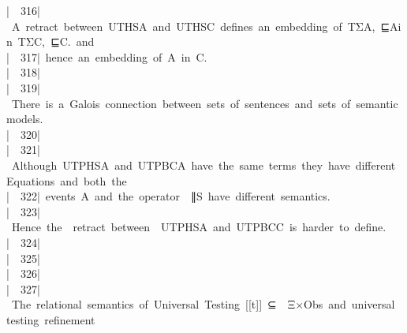 \documentclass{article}
\newcommand{\syntaxCOMMENTA}[1]{\textcolor[rgb]{0.8,0.0,0.0}{#1}}
\newcommand{\syntaxCOMMENTA}[1]{\textcolor[rgb]{0.8,0.0,0.0}{#1}}
\newcommand{\syntaxCOMMENTA}[1]{\textcolor[rgb]{0.8,0.0,0.0}{#1}}
\newcommand{\syntaxCOMMENTA}[1]{\textcolor[rgb]{0.8,0.0,0.0}{\textbf{#1}}}
\newcommand{\syntaxCOMMENTA}[1]{\textcolor[rgb]{0.8,0.0,0.0}{#1}}
\newcommand{\syntaxCOMMENTA}[1]{\textcolor[rgb]{0.8,0.0,0.0}{#1}}
\newcommand{\syntaxCOMMENTA}[1]{\textcolor[rgb]{0.0,0.0,0.0}{#1}}
\newcommand{\gutter}[1]{\textcolor[rgb]{0,0,0}{{|}#1}}
\newcommand{\gutterH}[1]{\textcolor[rgb]{1,0,0}{{|}#1}}
\begin{document}
\gutter{\ \ 316{|}\ }\syntaxCOMMENTA{A{\ }retract{\ }between{\ }UTHS\usebox{\underscorebox}A{\ }and{\ }UTHS\usebox{\underscorebox}C{\ }defines{\ }an{\ }embedding{\ }of{\ }\usebox{\lessthan}T\usebox{\underscorebox}Σ\usebox{\underscorebox}A,{\ }⊑\usebox{\underscorebox}A\usebox{\greaterthan}{\ }in{\ }\usebox{\lessthan}T\usebox{\underscorebox}Σ\usebox{\underscorebox}C,{\ }⊑\usebox{\underscorebox}C\usebox{\greaterthan}.{\ }and{\ }}\hspace*{\fill}\\
\gutter{\ \ 317{|}\ }\syntaxCOMMENTA{hence{\ }an{\ }embedding{\ }of{\ }A{\ }in{\ }C.}\hspace*{\fill}\\
\gutter{\ \ 318{|}\ }\hspace*{\fill}\\
\gutter{\ \ 319{|}\ }\syntaxCOMMENTA{There{\ }is{\ }a{\ }Galois{\ }connection{\ }between{\ }sets{\ }of{\ }sentences{\ }and{\ }sets{\ }of{\ }semantic{\ }models.}\hspace*{\fill}\\
\gutterH{\ \ 320{|}\ }\hspace*{\fill}\\
\gutter{\ \ 321{|}\ }\syntaxCOMMENTA{Although{\ }UTPHS\usebox{\underscorebox}A{\ }and{\ }UTPBC\usebox{\underscorebox}A{\ }have{\ }the{\ }same{\ }terms{\ }they{\ }have{\ }different{\ }Equations{\ }and{\ }both{\ }the{\ }}\hspace*{\fill}\\
\gutter{\ \ 322{|}\ }\syntaxCOMMENTA{events{\ }A{\ }and{\ }the{\ }operator{\ }{\ }∥\usebox{\underscorebox}S{\ }have{\ }different{\ }semantics.{\ }}\hspace*{\fill}\\
\gutter{\ \ 323{|}\ }\syntaxCOMMENTA{Hence{\ }the{\ }{\ }retract{\ }between{\ }{\ }UTPHS\usebox{\underscorebox}A{\ }and{\ }UTPBC\usebox{\underscorebox}C{\ }is{\ }harder{\ }to{\ }define.}\hspace*{\fill}\\
\gutter{\ \ 324{|}\ }\hspace*{\fill}\\
\gutterH{\ \ 325{|}\ }\hspace*{\fill}\\
\gutter{\ \ 326{|}\ }\hspace*{\fill}\\
\gutter{\ \ 327{|}\ }\syntaxCOMMENTA{The{\ }relational{\ }semantics{\ }of{\ }Universal{\ }Testing{\ }{[}{[}t{]}{]}{\ }⊆{\ }{\ }Ξ×Obs{\ }and{\ }universal{\ }testing{\ }refinement}\hspace*{\fill}\\
\end{document}
